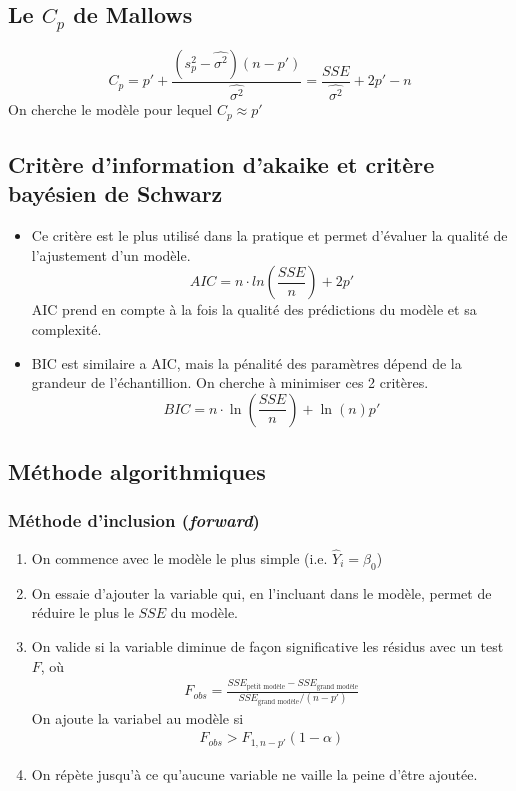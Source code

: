 \documentclass[10pt, french]{article}
\begin{document}
\begin{multicols*}{3}
\subsection*{Le $C_p$ de Mallows}
\[ C_p = p' + \frac{(s_p^2 - \hat{\sigma^2})(n - p')}{\hat{\sigma^2}} = \frac{SSE}{\hat{\sigma^2}} + 2p' - n\]
On cherche le modèle pour lequel $C_p \approx p'$

\subsection*{Critère d'information d'akaike et critère bayésien de Schwarz}
\begin{itemize}
\item Ce critère est le plus utilisé dans la pratique et permet d'évaluer la qualité de l'ajustement d'un modèle. 
\[ AIC = n \cdot ln\left(\frac{SSE}{n}\right) + 2p' \]
AIC prend en compte à la fois la qualité des prédictions du modèle et sa complexité.
\item BIC est similaire a AIC, mais la pénalité des paramètres dépend de la grandeur de l'échantillion.
On cherche à minimiser ces 2 critères.
\[ BIC = n \cdot \ln \left(\frac{SSE}{n}\right) + \ln(n)p' \]
\end{itemize}





\subsection*{Méthode algorithmiques}

\subsubsection*{Méthode d'inclusion (\textit{forward})}
\begin{enumerate}
\item On commence avec le modèle le plus simple (i.e. $\hat{Y}_i = \beta_0$)
\item On essaie d'ajouter la variable qui, en l'incluant dans le modèle, permet de réduire le plus le $SSE$ du modèle.
\item On valide si la variable diminue de façon significative les résidus avec un test $F$, où
\begin{align*}
F_{obs} = \frac{SSE_{\text{petit modèle}} - SSE_{\text{grand modèle}}}{SSE_{\text{grand modèle}} / (n-p')}
\end{align*}
On ajoute la variabel au modèle si
\begin{align*}
F_{obs} > F_{1, n-p'}(1 - \alpha)
\end{align*}
\item On répète jusqu'à ce qu'aucune variable ne vaille la peine d'être ajoutée.
\end{enumerate}



\end{multicols*}
\end{document}

